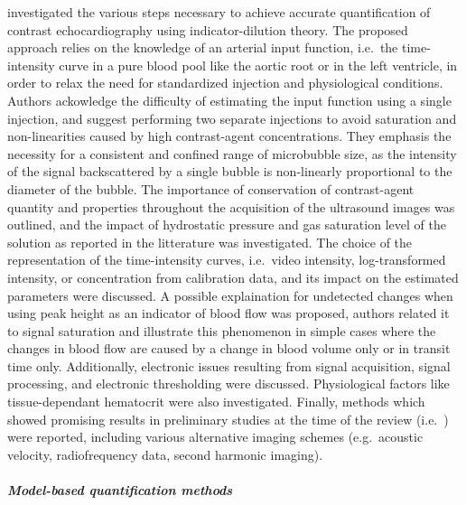 \citet{Wiencek:1993hr} investigated the various steps necessary to achieve accurate quantification of contrast echocardiography using indicator-dilution theory. 
The proposed approach relies on the knowledge of an arterial input function, i.e.~the time-intensity curve in a pure blood pool like the aortic root or in the left ventricle, in order to relax the need for standardized injection and physiological conditions.
Authors ackowledge the difficulty of estimating the input function using a single injection, and suggest performing two separate injections to avoid saturation and non-linearities caused by high contrast-agent concentrations.
They emphasis the necessity for a consistent and confined range of microbubble size, as the intensity of the signal backscattered by a single bubble is non-linearly proportional to the diameter of the bubble.
The importance of conservation of contrast-agent quantity and properties throughout the acquisition of the ultrasound images was outlined, and the impact of hydrostatic pressure and gas saturation level of the solution as reported in the litterature was investigated.
The choice of the representation of the time-intensity curves, i.e.~video intensity, log-transformed intensity, or concentration from calibration data, and its impact on the estimated parameters were discussed.
A possible explaination for undetected changes when using peak height as an indicator of blood flow was proposed, authors related it to signal saturation and illustrate this phenomenon in simple cases where the changes in blood flow are caused by a change in blood volume only or in transit time only.
Additionally, electronic issues resulting from signal acquisition, signal processing, and electronic thresholding were discussed.
Physiological factors like tissue-dependant hematocrit were also investigated.
Finally, methods which showed promising results in preliminary studies at the time of the review (i.e.~\citeyear{Wiencek:1993hr}) were reported, including various alternative imaging schemes (e.g.~acoustic velocity, radiofrequency data, second harmonic imaging).

\paragraph{\em{Model-based quantification methods}\\}

